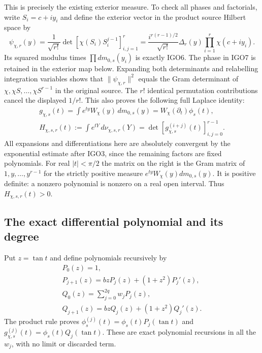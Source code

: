 \documentclass[11pt,a4paper]{article}
\begin{document}
This is precisely the existing exterior measure. To check all
phases and factorials, write $S_i=c+iy_i$ and define the exterior
vector in the product source Hilbert space by
\[
 \psi_{\chi,r}(y)=\frac1{\sqrt{r!}}
           \det[\chi(S_i)S_i^{j-1}]_{i,j=1}^r
   =\frac{i^{r(r-1)/2}}{\sqrt{r!}}
           \Delta_r(y)\prod_{i=1}^r\chi(c+iy_i).
 \tag{IGO7}
\]
Its squared modulus times $\prod dm_{0,s}(y_i)$ is exactly IGO6.
The phase in IGO7 is retained in the exterior map below.
Expanding both determinants and relabelling integration variables
shows that $\|\psi_{\chi,r}\|^2$ equals the Gram determinant of
$\chi,\chi S,\ldots,\chi S^{r-1}$ in the original source.
The $r!$ identical permutation contributions cancel the displayed
$1/r!$. This also proves the following full Laplace identity:
\[
 \begin{gathered}
 g_{\chi,s}(t)=\int e^{ty}W_\chi(y)\,dm_{0,s}(y)
       =W_\chi(\partial_t)\phi_s(t),\\
 H_{\chi,s,r}(t):=\int e^{tY}\,d\nu_{\chi,s,r}(Y)
       =\det[g_{\chi,s}^{(i+j)}(t)]_{i,j=0}^{r-1}.
 \end{gathered}
 \tag{IGO8}
\]
All expansions and differentiations here are absolutely convergent
by the exponential estimate after IGO3, since the remaining
factors are fixed polynomials. For real $|t|<\pi/2$ the matrix
on the right is the Gram matrix of $1,y,\ldots,y^{r-1}$ for the
strictly positive measure $e^{ty}W_\chi(y)dm_{0,s}(y)$.
It is positive definite: a nonzero polynomial is nonzero on a real
open interval. Thus $H_{\chi,s,r}(t)>0$.

\subsection{The exact differential polynomial and its degree}
Put $z=\tan t$ and define polynomials recursively by
\[
 \begin{gathered}
 P_0(z)=1,\\
 P_{j+1}(z)=bzP_j(z)+(1+z^2)P_j'(z),\\
 Q_0(z)=\sum_{j=0}^{2q}w_jP_j(z),\\
 Q_{j+1}(z)=bzQ_j(z)+(1+z^2)Q_j'(z).
 \end{gathered}
 \tag{IGO9}
\]
The product rule proves
$\phi_s^{(j)}(t)=\phi_s(t)P_j(\tan t)$ and
$g_{\chi,s}^{(j)}(t)=\phi_s(t)Q_j(\tan t)$.
These are exact polynomial recursions in all the $w_j$, with no
limit or discarded term.
\end{document}

